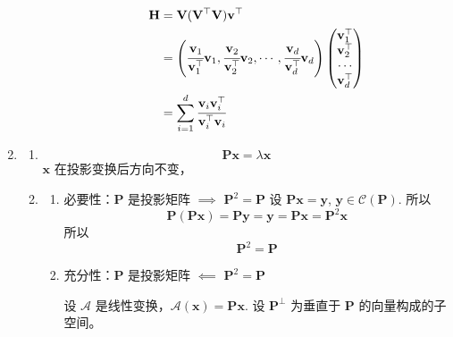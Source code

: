 \documentclass[11pt,letter,notitlepage]{article}
\begin{document}
\begin{solution}
\begin{enumerate}
\begin{enumerate}
\begin{enumerate}
				                  $$\begin{aligned}
						                  \mathbf{H}
						                   & =\mathbf{V}(\mathbf{V}^\top \mathbf{V})\mathbf{v}^\top                                 \\
						                   & =\left( \cfrac{\mathbf{v}_1}{\mathbf{v}_1^\top}\mathbf{v}_1,
						                  \cfrac{\mathbf{v}_2}{\mathbf{v}_2^\top}\mathbf{v}_2,
						                  \cdots,
						                  \cfrac{\mathbf{v}_d}{\mathbf{v}_d^\top}\mathbf{v}_d \right)
						                  \begin{pmatrix}
							                  \mathbf{v}_1^\top \\
							                  \mathbf{v}_2^\top \\
							                  \cdots            \\
							                  \mathbf{v}_d^\top
						                  \end{pmatrix}                                                                \\
						                   & = \sum_{i=1}^{d}{\cfrac{\mathbf{v}_i\mathbf{v}_i^\top}{\mathbf{v}_i^\top\mathbf{v}_i}}
					                  \end{aligned}$$
			            \end{enumerate}
		      \end{enumerate}
		\item \begin{enumerate}
			      \item $$\mathbf{P}\mathbf{x}=\lambda\mathbf{x}$$
			            $\mathbf{x}$ 在投影变换后方向不变，
			      \item \begin{enumerate}
				            \item 必要性：$\mathbf{P}$ 是投影矩阵 $\implies$ $\mathbf{P}^2=\mathbf{P}$
				                  设 $\mathbf{P}\mathbf{x}=\mathbf{y}$, $\mathbf{y}\in\mathcal{C}(\mathbf{P})$. 所以
				                  $$\mathbf{P}(\mathbf{P}\mathbf{x})
					                  = \mathbf{P}\mathbf{y}
					                  = \mathbf{y}
					                  = \mathbf{P}\mathbf{x}
					                  = \mathbf{P}^2 \mathbf{x}$$
				                  所以
				                  $$\mathbf{P}^2=\mathbf{P}$$
				            \item 充分性：$\mathbf{P}$ 是投影矩阵 $\impliedby$ $\mathbf{P}^2=\mathbf{P}$

				                  设 $\mathcal{A}$ 是线性变换，$\mathcal{A}(\mathbf{x})=\mathbf{P}\mathbf{x}$. 设 $\mathbf{P}^\bot$ 为垂直于 $\mathbf{P}$ 的向量构成的子空间。


\end{enumerate}
\end{enumerate}
\end{enumerate}
\end{solution}
\end{document}
